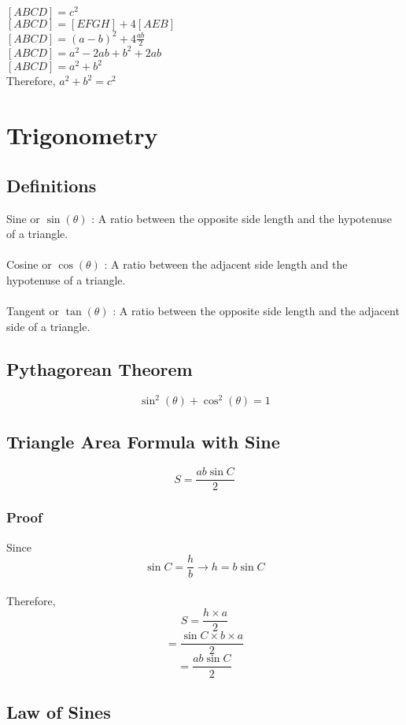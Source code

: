 \documentclass{article}
\begin{document}
\hfill
\begin{minipage}{0.87\linewidth}
$[ABCD]=c^2$\\
$[ABCD]=[EFGH]+4[AEB]$\\
$[ABCD]=(a-b)^2+4\frac{ab}{2}$\\
$[ABCD]=a^2-2ab+b^2+2ab$\\
$[ABCD]=a^2+b^2$\\
Therefore, $a^2+b^2=c^2$
\end{minipage}
\pagebreak

\section{Trigonometry}

\subsection{Definitions}

Sine or $\sin(\theta)$ : A ratio between the opposite side length and the hypotenuse of a triangle.
\\ \\
Cosine or $\cos(\theta)$ : A ratio between the adjacent side length and the hypotenuse of a triangle.
\\ \\
Tangent or $\tan(\theta)$ : A ratio between the opposite side length and the adjacent side of a triangle.

\subsection{Pythagorean Theorem}
$$\sin^2 (\theta)+\cos^2 (\theta)=1$$

\subsection{Triangle Area Formula with Sine}

$$S=\frac{ab\sin C}{2}$$

\subsubsection{Proof}
Since $$\sin C=\frac{h}{b}\longrightarrow h=b\sin C$$\\
Therefore, $$S=\frac{h\times a}{2}$$
$$=\frac{\sin C\times b\times a}{2}$$
$$=\frac{ab\sin C}{2}$$
\pagebreak

\subsection{Law of Sines}
\end{document}
